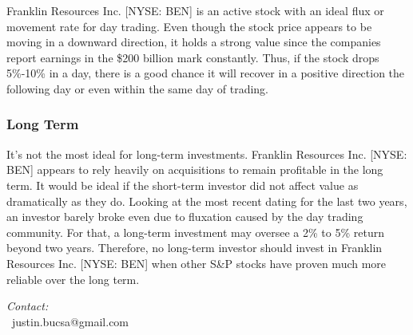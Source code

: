 \documentclass[9pt,a4paper,twoside]{tau}
\begin{document}
        Franklin Resources Inc. [NYSE: BEN] is an active stock with an ideal flux or movement rate for day trading. Even though the stock price appears to be moving in a downward direction, it holds a strong value since the companies report earnings in the \$200 billion mark constantly. Thus, if the stock drops 5\%-10\% in a day, there is a good chance it will recover in a positive direction the following day or even within the same day of trading.

    \subsubsection{Long Term}

        It's not the most ideal for long-term investments. Franklin Resources Inc. [NYSE: BEN] appears to rely heavily on acquisitions to remain profitable in the long term. It would be ideal if the short-term investor did not affect value as dramatically as they do. Looking at the most recent dating for the last two years, an investor barely broke even due to fluxation caused by the day trading community. For that, a long-term investment may oversee a 2\% to 5\% return beyond two years. Therefore, no long-term investor should invest in Franklin Resources Inc. [NYSE: BEN] when other S\&P stocks have proven much more reliable over the long term.
					

\printbibliography


\begin{center}
	\vskip10pt
	\vskip10pt
	\textit{Contact:} \\
	\faEnvelope[regular]\ justin.bucsa@gmail.com \\
\end{center}


\end{document}

